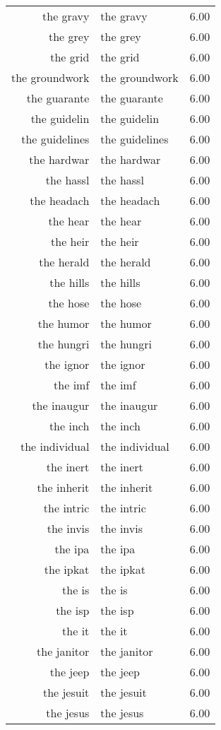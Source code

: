\begin{table}[ht]
\begin{tabular}{rlr}
  the gravy & the gravy & 6.00 \\ 
  the grey & the grey & 6.00 \\ 
  the grid & the grid & 6.00 \\ 
  the groundwork & the groundwork & 6.00 \\ 
  the guarante & the guarante & 6.00 \\ 
  the guidelin & the guidelin & 6.00 \\ 
  the guidelines & the guidelines & 6.00 \\ 
  the hardwar & the hardwar & 6.00 \\ 
  the hassl & the hassl & 6.00 \\ 
  the headach & the headach & 6.00 \\ 
  the hear & the hear & 6.00 \\ 
  the heir & the heir & 6.00 \\ 
  the herald & the herald & 6.00 \\ 
  the hills & the hills & 6.00 \\ 
  the hose & the hose & 6.00 \\ 
  the humor & the humor & 6.00 \\ 
  the hungri & the hungri & 6.00 \\ 
  the ignor & the ignor & 6.00 \\ 
  the imf & the imf & 6.00 \\ 
  the inaugur & the inaugur & 6.00 \\ 
  the inch & the inch & 6.00 \\ 
  the individual & the individual & 6.00 \\ 
  the inert & the inert & 6.00 \\ 
  the inherit & the inherit & 6.00 \\ 
  the intric & the intric & 6.00 \\ 
  the invis & the invis & 6.00 \\ 
  the ipa & the ipa & 6.00 \\ 
  the ipkat & the ipkat & 6.00 \\ 
  the is & the is & 6.00 \\ 
  the isp & the isp & 6.00 \\ 
  the it & the it & 6.00 \\ 
  the janitor & the janitor & 6.00 \\ 
  the jeep & the jeep & 6.00 \\ 
  the jesuit & the jesuit & 6.00 \\ 
  the jesus & the jesus & 6.00 \\ 

\end{tabular}
\end{table}
